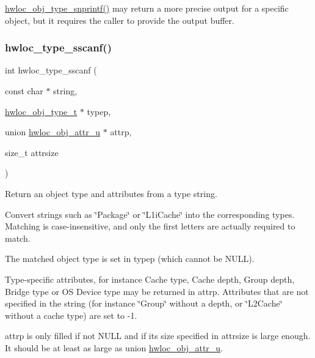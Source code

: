 \hyperlink{a00188_gadb8765c260edea80c52cd06a76639ba4}{hwloc\+\_\+obj\+\_\+type\+\_\+snprintf()} may return a more precise output for a specific object, but it requires the caller to provide the output buffer. \mbox{\label{a00188_ga510f21b066fba2dab12b8c9b173b1dfd}} 
\subsubsection{\texorpdfstring{hwloc\+\_\+type\+\_\+sscanf()}{hwloc\_type\_sscanf()}}
{\footnotesize\ttfamily int hwloc\+\_\+type\+\_\+sscanf (\begin{DoxyParamCaption}\item[{const char $\ast$}]{string,  }\item[{\hyperlink{a00184_gacd37bb612667dc437d66bfb175a8dc55}{hwloc\+\_\+obj\+\_\+type\+\_\+t} $\ast$}]{typep,  }\item[{union \hyperlink{a00242}{hwloc\+\_\+obj\+\_\+attr\+\_\+u} $\ast$}]{attrp,  }\item[{size\+\_\+t}]{attrsize }\end{DoxyParamCaption})}



Return an object type and attributes from a type string. 

Convert strings such as \char`\"{}\+Package\char`\"{} or \char`\"{}\+L1i\+Cache\char`\"{} into the corresponding types. Matching is case-\/insensitive, and only the first letters are actually required to match.

The matched object type is set in {\ttfamily typep} (which cannot be {\ttfamily N\+U\+LL}).

Type-\/specific attributes, for instance Cache type, Cache depth, Group depth, Bridge type or OS Device type may be returned in {\ttfamily attrp}. Attributes that are not specified in the string (for instance \char`\"{}\+Group\char`\"{} without a depth, or \char`\"{}\+L2\+Cache\char`\"{} without a cache type) are set to -\/1.

{\ttfamily attrp} is only filled if not {\ttfamily N\+U\+LL} and if its size specified in {\ttfamily attrsize} is large enough. It should be at least as large as union \hyperlink{a00242}{hwloc\+\_\+obj\+\_\+attr\+\_\+u}.


